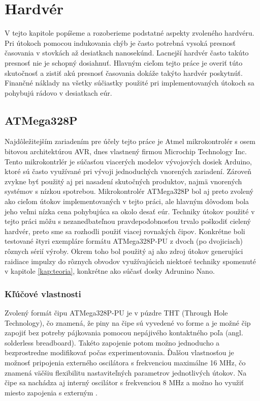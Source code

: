 \chapter{Hardvér}

\label{kap:hardver} %

V tejto kapitole popíšeme a rozoberieme podstatné aspekty zvoleného hardvéru. Pri útokoch pomocou indukovania chýb je často potrebná vysoká presnosť časovania v stovkách až desiatkach nanosekúnd. Lacnejší hardvér často takúto presnosť nie je schopný dosiahnuť. Hlavným cieľom tejto práce je overiť túto skutočnosť a zistiť akú presnosť časovania dokáže takýto hardvér poskytnúť. Finančné náklady na všetky súčiastky použité pri implementovaných útokoch sa pohybujú rádovo v desiatkach eúr.

\section{ATMega328P}
Najdôležitejším zariadením pre účely tejto práce je Atmel mikrokontrolér s osem bitovou architektúrou AVR, dnes vlastnený firmou Microchip Technology Inc. Tento mikrokontrlér je súčasťou viacerých modelov vývojových dosiek Arduino, ktoré sú často využívané pri vývoji jednoduchých vnorených zariadení. Zároveň zvykne byť použitý aj pri nasadení skutočných produktov, najmä vnorených systémov s nízkou spotrebou. Mikrokontrolér ATMega328P bol aj preto zvolený ako cieľom útokov implementovaných v tejto práci, ale hlavným dôvodom bola jeho veľmi nízka cena pohybujúca sa okolo desať eúr. Techniky útokov použité v tejto práci môžu s nezanedbateľnou pravdepodobnosťou trvalo poškodiť cielený hardvér, preto sme sa rozhodli použiť viacej rovnakých čipov. Konkrétne boli testované štyri exempláre formátu ATMega328P-PU z dvoch (po dvojiciach) rôznych sérií výroby. Okrem toho bol použitý aj ako zdroj útokov generujúci raidiace impulzy do rôznych obvodov využívajúcich niektoré techniky spomenuté v kapitole \ref{kap:teoria}, konkrétne ako súčasť dosky Adrunino Nano.

\subsection{Kľúčové vlastnosti}
Zvolený formát čipu ATMega328P-PU je v púzdre THT (Through Hole Technology), čo znamená, že piny na čipe sú vyvedené vo forme  a je možné čip zapojiť bez potreby pájkovania pomocou nepájivého kontaktného poľa (angl. solderless breadboard). Takéto zapojenie potom možno jednoducho a bezprostredne modifikovať počas experimentovania. Ďalšou vlastnosťou je možnosť pripojenia externého oscilátora s frekvenciou maximálne 16 MHz, čo znamená väčšiu flexibilitu nastaviteľných parametrov jednotlivých útokov. Na čipe sa nachádza aj interný oscilátor s frekvenciou 8 MHz a možno ho využiť miesto zapojenia s externým \cite{atmegaData}.

